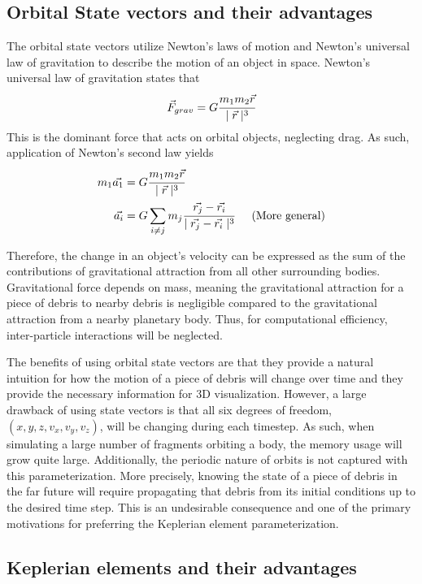 \documentclass[a4paper, 12pt]{article}
\begin{document}
\subsection{Orbital State vectors and their advantages}

The orbital state vectors utilize Newton's laws of motion and Newton's universal law of gravitation to describe the motion of an object in space. 
Newton's universal law of gravitation states that $$\vec{F}_{grav} = G\cfrac{ m_1 m_2 \vec{r}}{\mid\vec{r}\mid^3}$$ \noindent This is the dominant force that acts on orbital objects, neglecting drag. As such, application of Newton's second law yields
\begin{align}
	m_1 \vec{a_1}  & = G\cfrac{m_1 m_2 \vec{r}}{\mid\vec{r}\mid^3}\\
	\vec{a_i}  &= G \sum_{i \ne j}  m_j \cfrac{\vec{r_j} -\vec{r_i}}{\mid\vec{r_j} - \vec{r_i}\mid^3} \indent\text{(More general)}
\end{align}

Therefore, the change in an object's velocity can be expressed as the sum of the contributions of gravitational attraction from all other surrounding bodies. Gravitational force depends on mass, meaning the gravitational attraction for a piece of debris to nearby debris is negligible compared to the gravitational attraction from a nearby planetary body. Thus, for computational efficiency, inter-particle interactions will be neglected.

The benefits of using orbital state vectors are that they provide a natural intuition for how the motion of a piece of debris will change over time and they provide the necessary information for 3D visualization. However, a large drawback of using state vectors is that all six degrees of freedom, $ (x, y, z, v_x, v_y, v_z)$, will be changing during each timestep. As such, when simulating a large number of fragments orbiting a body, the memory usage will grow quite large. Additionally, the periodic nature of orbits is not captured with this parameterization. More precisely, knowing the state of a piece of debris in the far future will require propagating that debris from its initial conditions up to the desired time step. This is an undesirable consequence and one of the primary motivations for preferring the Keplerian element parameterization.
 
\newpage
\subsection{Keplerian elements and their advantages}
\end{document}
